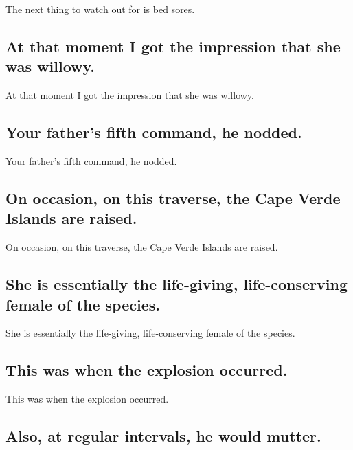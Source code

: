 \documentclass[]{article}
\begin{document}
The next thing to watch out for is bed sores.

\hypertarget{at-that-moment-i-got-the-impression-that-she-was-willowy.}{%
\subsection{At that moment I got the impression that she was
willowy.}\label{at-that-moment-i-got-the-impression-that-she-was-willowy.}}

At that moment I got the impression that she was willowy.

\hypertarget{your-fathers-fifth-command-he-nodded.}{%
\subsection{Your father's fifth command, he
nodded.}\label{your-fathers-fifth-command-he-nodded.}}

Your father's fifth command, he nodded.

\hypertarget{on-occasion-on-this-traverse-the-cape-verde-islands-are-raised.}{%
\subsection{On occasion, on this traverse, the Cape Verde Islands are
raised.}\label{on-occasion-on-this-traverse-the-cape-verde-islands-are-raised.}}

On occasion, on this traverse, the Cape Verde Islands are raised.

\hypertarget{she-is-essentially-the-life-giving-life-conserving-female-of-the-species.}{%
\subsection{She is essentially the life-giving, life-conserving female
of the
species.}\label{she-is-essentially-the-life-giving-life-conserving-female-of-the-species.}}

She is essentially the life-giving, life-conserving female of the
species.

\hypertarget{this-was-when-the-explosion-occurred.}{%
\subsection{This was when the explosion
occurred.}\label{this-was-when-the-explosion-occurred.}}

This was when the explosion occurred.

\hypertarget{also-at-regular-intervals-he-would-mutter.}{%
\subsection{Also, at regular intervals, he would
mutter.}\label{also-at-regular-intervals-he-would-mutter.}}
\end{document}
